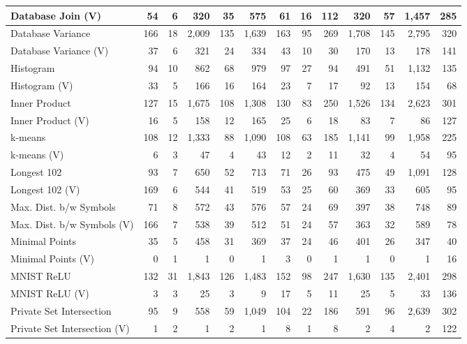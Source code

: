 {\begin{table*}[htbp]
\begin{tabular}{lrrrrrrrrrrrr}
            Database Join (V) & 54 & 6 & 320 & 35 & 575 & 61 & 16 & 112 & 320 & 57 & 1,457 & 285\\
            \midrule
            Database Variance & 166 & 18 & 2,009 & 135 & 1,639 & 163 & 95 & 269 & 1,708 & 145 & 2,795 & 320\\
            Database Variance (V) & 37 & 6 & 321 & 24 & 334 & 43 & 10 & 30 & 170 & 13 & 178 & 141\\
            \midrule
            Histogram & 94 & 10 & 862 & 68 & 979 & 97 & 27 & 94 & 491 & 51 & 1,132 & 135\\
            Histogram (V) & 33 & 5 & 166 & 16 & 164 & 23 & 7 & 17 & 92 & 13 & 154 & 68\\
            \midrule
            Inner Product & 127 & 15 & 1,675 & 108 & 1,308 & 130 & 83 & 250 & 1,526 & 134 & 2,623 & 301\\
            Inner Product (V) & 16 & 5 & 158 & 12 & 165 & 25 & 6 & 18 & 83 & 7 & 86 & 127\\
            \midrule
            k-means & 108 & 12 & 1,333 & 88 & 1,090 & 108 & 63 & 185 & 1,141 & 99 & 1,958 & 225\\
            k-means (V) & 6 & 3 & 47 & 4 & 43 & 12 & 2 & 11 & 32 & 4 & 54 & 95\\
            \midrule
            Longest 102 & 93 & 7 & 650 & 52 & 713 & 71 & 26 & 93 & 475 & 49 & 1,091 & 128\\
            Longest 102 (V) & 169 & 6 & 544 & 41 & 519 & 53 & 25 & 60 & 369 & 33 & 605 & 95\\
            \midrule
            Max. Dist. b/w Symbols & 71 & 8 & 572 & 43 & 576 & 57 & 24 & 69 & 397 & 38 & 748 & 89\\
            Max. Dist. b/w Symbols (V) & 166 & 7 & 538 & 39 & 512 & 51 & 24 & 57 & 363 & 32 & 589 & 78\\
            \midrule
            Minimal Points & 35 & 5 & 458 & 31 & 369 & 37 & 24 & 46 & 401 & 26 & 347 & 40\\
            Minimal Points (V) & 0 & 1 & 1 & 0 & 1 & 3 & 0 & 1 & 1 & 0 & 1 & 16\\
            \midrule
            MNIST ReLU & 132 & 31 & 1,843 & 126 & 1,483 & 152 & 98 & 247 & 1,630 & 135 & 2,401 & 298\\
            MNIST ReLU (V) & 3 & 3 & 25 & 3 & 9 & 17 & 5 & 11 & 25 & 5 & 33 & 136\\
            \midrule
            Private Set Intersection & 95 & 9 & 558 & 59 & 1,049 & 104 & 22 & 186 & 591 & 96 & 2,639 & 302\\
            Private Set Intersection (V) & 1 & 2 & 1 & 2 & 1 & 8 & 1 & 8 & 2 & 4 & 2 & 122\\
          \bottomrule
       \end{tabular}
       \label{table:metrics}
   \end{table*}
}
